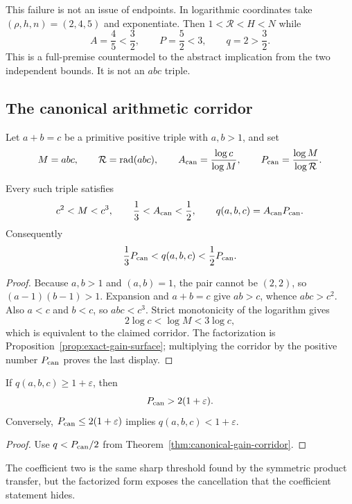 This failure is not an issue of endpoints.  In logarithmic coordinates take
$(\rho,h,n)=(2,4,5)$ and exponentiate.  Then $1<\mathcal R<H<N$ while
\[
 A=\frac45<\frac32,\qquad P=\frac52<3,
 \qquad q=2>\frac32.
\]
This is a full-premise countermodel to the abstract implication from the two
independent bounds.  It is not an $abc$ triple.

\subsection{The canonical arithmetic corridor}

Let $a+b=c$ be a primitive positive triple with $a,b>1$, and set
\[
 M=abc,\qquad \mathcal R=\operatorname{rad}(abc),\qquad
 A_{\rm can}=\frac{\log c}{\log M},\qquad
 P_{\rm can}=\frac{\log M}{\log \mathcal R}.
\]

\begin{theorem}
\label{thm:canonical-gain-corridor}
Every such triple satisfies
\[
 c^2<M<c^3,
 \qquad
 \frac13<A_{\rm can}<\frac12,
 \qquad
 q(a,b,c)=A_{\rm can}P_{\rm can}.
\]
Consequently
\[
 \frac13P_{\rm can}<q(a,b,c)<\frac12P_{\rm can}.
\]
\end{theorem}

\begin{proof}
Because $a,b>1$ and $(a,b)=1$, the pair cannot be $(2,2)$, so
$(a-1)(b-1)>1$.  Expansion and $a+b=c$ give $ab>c$, whence
$abc>c^2$.  Also $a<c$ and $b<c$, so $abc<c^3$.  Strict monotonicity
of the logarithm gives
\[
 2\log c<\log M<3\log c,
\]
which is equivalent to the claimed corridor.  The factorization is
Proposition~\ref{prop:exact-gain-surface}; multiplying the corridor by the
positive number $P_{\rm can}$ proves the last display.
\end{proof}

\begin{corollary}
\label{cor:canonical-power-concentration}
If $q(a,b,c)\ge1+\varepsilon$, then
\[
 P_{\rm can}>2(1+\varepsilon).
\]
Conversely, $P_{\rm can}\le2(1+\varepsilon)$ implies
$q(a,b,c)<1+\varepsilon$.
\end{corollary}

\begin{proof}
Use $q<P_{\rm can}/2$ from
Theorem~\ref{thm:canonical-gain-corridor}.
\end{proof}

The coefficient two is the same sharp threshold found by the symmetric
product transfer, but the factorized form exposes the cancellation that the
coefficient statement hides.


